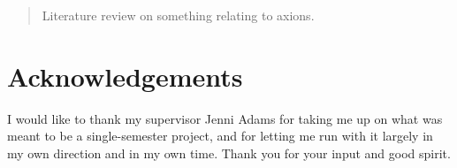 





\begin{abstract}
	Literature review on something relating to axions.
\end{abstract}

\tableofcontents
\newpage
{}

\setcounter{chapter}{-1}









\section*{Acknowledgements}

I would like to thank my supervisor Jenni Adams for taking me up on what was meant to be a single-semester project, and for letting me run with it largely in my own direction and in my own time.
Thank you for your input and good spirit.

\begingroup
\let\clearpage\relax
{}
\printbibliography
\endgroup





